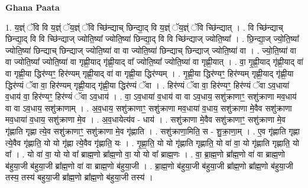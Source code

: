 \documentclass[17pt]{extarticle}
\begin{document}
\textbf{Ghana Paata } \newline

1. य॒ज्ञ्ं ॅवि वि य॒ज्ञ्ं ॅय॒ज्ञ्ं ॅवि च्छि॑न्द्याच् छिन्द्या॒द् वि य॒ज्ञ्ं ॅय॒ज्ञ्ं ॅवि च्छि॑न्द्यात् । . वि च्छि॑न्द्याच् छिन्द्या॒द् वि वि च्छि॑न्द्याज् ज्योति॒ष्या᳚ ज्योति॒ष्या॑ छिन्द्या॒द् वि वि च्छि॑न्द्याज् ज्योति॒ष्या᳚ । . छि॒न्द्या॒ज् ज्यो॒ति॒ष्या᳚ ज्योति॒ष्या॑ छिन्द्याच् छिन्द्याज् ज्योति॒ष्या॑ वा वा ज्योति॒ष्या॑ छिन्द्याच् छिन्द्याज् ज्योति॒ष्या॑ वा । . ज्यो॒ति॒ष्या॑ वा वा ज्योति॒ष्या᳚ ज्योति॒ष्या॑ वा गृह्णी॒याद् गृ॑ह्णी॒याद् वा᳚ ज्योति॒ष्या᳚ ज्योति॒ष्या॑ वा गृह्णी॒यात् । . वा॒ गृ॒ह्णी॒याद् गृ॑ह्णी॒याद् वा॑ वा गृह्णी॒या द्धिर॑ण्यꣳ॒॒ हिर॑ण्यम् गृह्णी॒याद् वा॑ वा गृह्णी॒या द्धिर॑ण्यम् । . गृ॒ह्णी॒या द्धिर॑ण्यꣳ॒॒ हिर॑ण्यम् गृह्णी॒याद् गृ॑ह्णी॒या द्धिर॑ण्यं ॅवा वा॒ हिर॑ण्यम् गृह्णी॒याद् गृ॑ह्णी॒या द्धिर॑ण्यं ॅवा । . हिर॑ण्यं ॅवा वा॒ हिर॑ण्यꣳ॒॒ हिर॑ण्यं ॅवा ऽव॒धाया॑ व॒धाय॑ वा॒ हिर॑ण्यꣳ॒॒ हिर॑ण्यं ॅवा ऽव॒धाय॑ । . वा॒ ऽव॒धाया॑ व॒धाय॑ वा वा ऽव॒धाय॒ सशु॑क्राणाꣳ॒॒ सशु॑क्राणा मव॒धाय॑ वा वा ऽव॒धाय॒ सशु॑क्राणाम् । . अ॒व॒धाय॒ सशु॑क्राणाꣳ॒॒ सशु॑क्राणा मव॒धाया॑ व॒धाय॒ सशु॑क्राणा मे॒वैव सशु॑क्राणा मव॒धाया॑ व॒धाय॒ सशु॑क्राणा मे॒व । . अ॒व॒धायेत्य॑व - धाय॑ । . सशु॑क्राणा मे॒वैव सशु॑क्राणाꣳ॒॒ सशु॑क्राणा मे॒व गृ॑ह्णाति गृह्णा त्ये॒व सशु॑क्राणाꣳ॒॒ सशु॑क्राणा मे॒व गृ॑ह्णाति । . सशु॑क्राणा॒मिति॒ स - शु॒क्रा॒णा॒म् । . ए॒व गृ॑ह्णाति गृह्णा त्ये॒वैव गृ॑ह्णाति॒ यो यो गृ॑ह्णा त्ये॒वैव गृ॑ह्णाति॒ यः । . गृ॒ह्णा॒ति॒ यो यो गृ॑ह्णाति गृह्णाति॒ यो वा॑ वा॒ यो गृ॑ह्णाति गृह्णाति॒ यो वा᳚ । . यो वा॑ वा॒ यो यो वा᳚ ब्राह्म॒णो ब्रा᳚ह्म॒णो वा॒ यो यो वा᳚ ब्राह्म॒णः । . वा॒ ब्रा॒ह्म॒णो ब्रा᳚ह्म॒णो वा॑ वा ब्राह्म॒णो ब॑हुया॒जी ब॑हुया॒जी ब्रा᳚ह्म॒णो वा॑ वा ब्राह्म॒णो ब॑हुया॒जी । . ब्रा॒ह्म॒णो ब॑हुया॒जी ब॑हुया॒जी ब्रा᳚ह्म॒णो ब्रा᳚ह्म॒णो ब॑हुया॒जी तस्य॒ तस्य॑ बहुया॒जी ब्रा᳚ह्म॒णो ब्रा᳚ह्म॒णो ब॑हुया॒जी तस्य॑ । \newline
\end{document}
